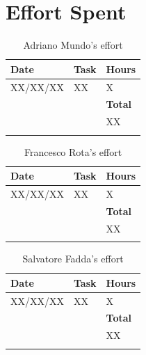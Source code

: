\documentclass{article}
\begin{document}
\section{Effort Spent}
\begin{longtable}{| p{2 cm} | p{6 cm} | p{1 cm} |} 
			\hline
			{\bf Date} & {\bf Task} & {\bf Hours}\\
			\hline
			XX/XX/XX & XX & X \\
			\hline
			& & {\bf Total} \\
			\hline
			& & XX \\
			\hline
			\caption{Adriano Mundo's effort} 
\end{longtable}

\begin{longtable}{| p{2 cm} | p{6 cm} | p{1 cm} |} 
			\hline
			{\bf Date} & {\bf Task} & {\bf Hours}\\
			\hline
			XX/XX/XX & XX & X \\
			\hline
			& & {\bf Total} \\
			\hline
			& & XX \\
			\hline
			\caption{Francesco Rota's effort} 
\end{longtable}

\begin{longtable}{| p{2 cm} | p{6 cm} | p{1 cm} |} 
			\hline
			{\bf Date} & {\bf Task} & {\bf Hours}\\
			\hline
			XX/XX/XX & XX & X \\
			\hline
			& & {\bf Total} \\
			\hline
			& & XX \\
			\hline
			\caption{Salvatore Fadda's effort} 
\end{longtable}
	
	
\end{document}
